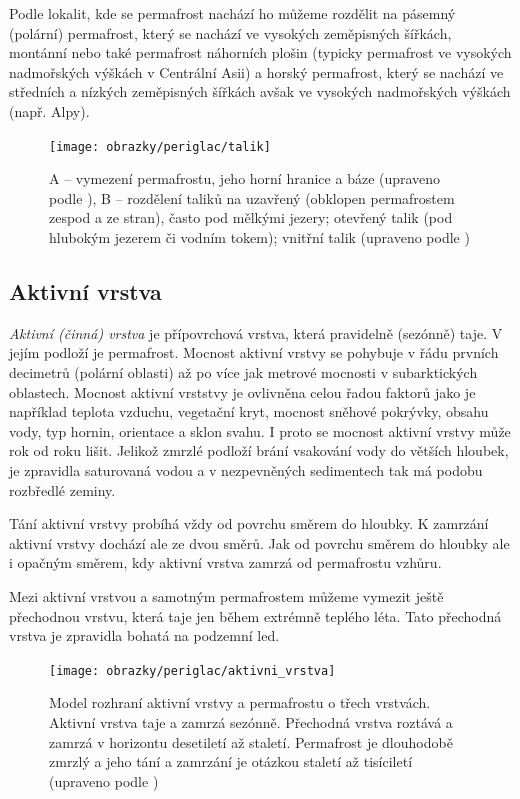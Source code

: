 Podle lokalit, kde se permafrost nachází ho můžeme rozdělit na pásemný (polární) permafrost, který se nachází ve vysokých zeměpisných šířkách, montánní nebo také permafrost náhorních plošin (typicky permafrost ve vysokých nadmořských výškách v Centrální Asii) a horský permafrost, který se nachází ve středních a nízkých zeměpisných šířkách avšak ve vysokých nadmořských výškách (např. Alpy).


\begin{figure}[h]
	\centering
	\texttt{[image: obrazky/periglac/talik]}
	\caption{A -- vymezení permafrostu, jeho horní hranice a báze (upraveno podle \textcite{jrPermafrostRelatedEngineering1969}), B -- rozdělení taliků na uzavřený (obklopen permafrostem zespod a ze stran), často pod mělkými jezery; otevřený talik (pod hlubokým jezerem či vodním tokem); vnitřní talik (upraveno podle \textcite{demekObecnaGeomorfologie1987})}
	\label{fig:talik}
\end{figure}

\subsection{Aktivní vrstva}
\emph{Aktivní (činná) vrstva} je přípovrchová vrstva, která pravidelně (sezónně) taje. V jejím podloží je permafrost. Mocnost aktivní vrstvy se pohybuje v řádu prvních decimetrů (polární oblasti) až po více jak metrové mocnosti v subarktických oblastech. Mocnost aktivní vrststvy je ovlivněna celou řadou faktorů jako je například teplota vzduchu, vegetační kryt, mocnost sněhové pokrývky, obsahu vody, typ hornin, orientace a sklon svahu. I proto se mocnost aktivní vrstvy může rok od roku lišit. Jelikož zmrzlé podloží brání vsakování vody do větších hloubek, je zpravidla saturovaná vodou a v nezpevněných sedimentech tak má podobu rozbředlé zeminy. 

Tání aktivní vrstvy probíhá vždy od povrchu směrem do hloubky. K zamrzání aktivní vrstvy dochází ale ze dvou směrů. Jak od povrchu směrem do hloubky ale i opačným směrem, kdy aktivní vrstva zamrzá od permafrostu vzhůru. 

Mezi aktivní vrstvou a samotným permafrostem můžeme vymezit ještě přechodnou vrstvu, která taje jen během extrémně teplého léta. Tato přechodná vrstva je zpravidla bohatá na podzemní led.

\begin{figure}[h]
	\centering
	\texttt{[image: obrazky/periglac/aktivni\_vrstva]}
	\caption{Model rozhraní aktivní vrstvy a permafrostu o třech vrstvách. Aktivní vrstva taje a zamrzá sezónně. Přechodná vrstva roztává a zamrzá v horizontu desetiletí až staletí. Permafrost je dlouhodobě zmrzlý a jeho tání a zamrzání je otázkou staletí až tisíciletí (upraveno podle \textcite{frenchPeriglacialEnvironment2017})}
	\label{fig:aktivnivrstva}
\end{figure}


